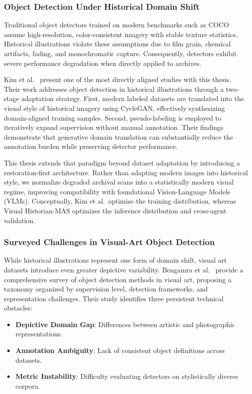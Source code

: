 \documentclass[12pt,onecolumn,a4paper]{IEEEtran}
\begin{document}
\subsubsection{Object Detection Under Historical Domain Shift}
Traditional object detectors trained on modern benchmarks such as COCO \cite{coco2014} assume high-resolution, color-consistent imagery with stable texture statistics. Historical illustrations violate these assumptions due to film grain, chemical artifacts, fading, and monochromatic capture. Consequently, detectors exhibit severe performance degradation when directly applied to archives.

Kim et al.~\cite{kim2024historical_od} present one of the most directly aligned studies with this thesis. Their work addresses object detection in historical illustrations through a two-stage adaptation strategy. First, modern labeled datasets are translated into the visual style of historical imagery using CycleGAN, effectively synthesizing domain-aligned training samples. Second, pseudo-labeling is employed to iteratively expand supervision without manual annotation. Their findings demonstrate that generative domain translation can substantially reduce the annotation burden while preserving detector performance.

This thesis extends that paradigm beyond dataset adaptation by introducing a restoration-first architecture. Rather than adapting modern images into historical style, we normalize degraded archival scans into a statistically modern visual regime, improving compatibility with foundational Vision-Language Models (VLMs). Conceptually, Kim et al.~optimize the training distribution, whereas Visual Historian-MAS optimizes the inference distribution and cross-agent validation.

\subsubsection{Surveyed Challenges in Visual-Art Object Detection}
While historical illustrations represent one form of domain shift, visual art datasets introduce even greater depictive variability. Bengamra et al.~\cite{bengamra2024survey_visualart_od} provide a comprehensive survey of object detection methods in visual art, proposing a taxonomy organized by supervision level, detection frameworks, and representation challenges. Their study identifies three persistent technical obstacles:

\begin{itemize}
    \item \textbf{Depictive Domain Gap}: Differences between artistic and photographic representations.
    \item \textbf{Annotation Ambiguity}: Lack of consistent object definitions across datasets.
    \item \textbf{Metric Instability}: Difficulty evaluating detectors on stylistically diverse corpora.
\end{itemize}
\end{document}
